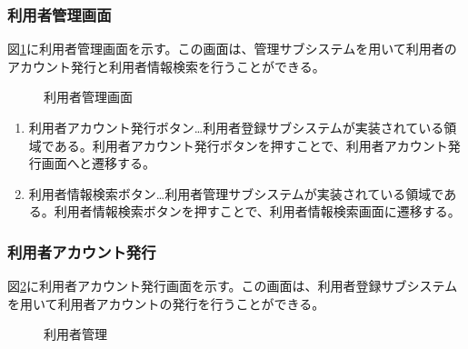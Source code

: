 \documentclass[a4j]{jarticle}
\begin{document}
\subsubsection{利用者管理画面}
図\ref{fig:user_admin_top}に利用者管理画面を示す。この画面は、管理サブシステムを用いて利用者のアカウント発行と利用者情報検索を行うことができる。
\begin{figure}[H]
\centering
{}
\caption{利用者管理画面}
\label{fig:user_admin_top}
\end{figure}

\begin{enumerate}
  \renewcommand{\labelenumi}{\textcircled{\scriptsize \theenumi}}

\item 利用者アカウント発行ボタン…利用者登録サブシステムが実装されている領域である。利用者アカウント発行ボタンを押すことで、利用者アカウント発行画面へと遷移する。

\item 利用者情報検索ボタン…利用者管理サブシステムが実装されている領域である。利用者情報検索ボタンを押すことで、利用者情報検索画面に遷移する。

\end{enumerate}

\subsubsection{利用者アカウント発行}
図\ref{fig:create_user}に利用者アカウント発行画面を示す。この画面は、利用者登録サブシステムを用いて利用者アカウントの発行を行うことができる。
\begin{figure}[H]
\centering
{}
\caption{利用者管理}
\label{fig:create_user}
\end{figure}
\end{document}
